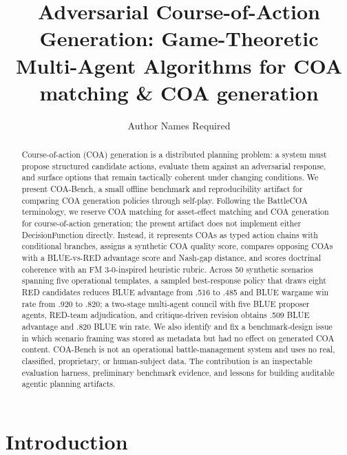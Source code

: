 \documentclass[sigconf]{acmart}
\title{Adversarial Course-of-Action Generation: Game-Theoretic Multi-Agent Algorithms for COA matching \& COA generation}
\author{Author Names Required}
\affiliation{%
  \institution{Organization Required}
  \city{City Required}
  \country{Country Required}}
\begin{document}
\begin{abstract}
Course-of-action (COA) generation is a distributed planning problem: a system must propose structured candidate actions, evaluate them against an adversarial response, and surface options that remain tactically coherent under changing conditions. We present COA-Bench, a small offline benchmark and reproducibility artifact for comparing COA generation policies through self-play. Following the BattleCOA terminology, we reserve COA matching for asset-effect matching and COA generation for course-of-action generation; the present artifact does not implement either DecisionFunction directly. Instead, it represents COAs as typed action chains with conditional branches, assigns a synthetic COA quality score, compares opposing COAs with a BLUE-vs-RED advantage score and Nash-gap distance, and scores doctrinal coherence with an FM 3-0-inspired heuristic rubric. Across 50 synthetic scenarios spanning five operational templates, a sampled best-response policy that draws eight RED candidates reduces BLUE advantage from .516 to .485 and BLUE wargame win rate from .920 to .820; a two-stage multi-agent council with five BLUE proposer agents, RED-team adjudication, and critique-driven revision obtains .509 BLUE advantage and .820 BLUE win rate. We also identify and fix a benchmark-design issue in which scenario framing was stored as metadata but had no effect on generated COA content. COA-Bench is not an operational battle-management system and uses no real, classified, proprietary, or human-subject data. The contribution is an inspectable evaluation harness, preliminary benchmark evidence, and lessons for building auditable agentic planning artifacts.
\end{abstract}



\maketitle

\section{Introduction}
\end{document}
